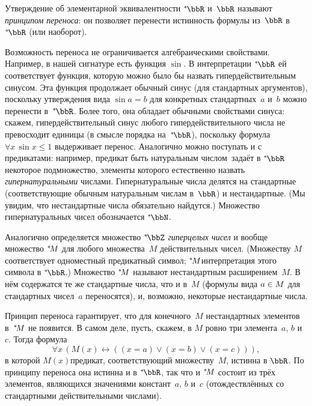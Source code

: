 Утверждение об элементарной эквивалентности $\nstR$
и~$\bbR$ называют \emph{принципом переноса}:%
он позволяет
перенести истинность формулы из~$\bbR$ в~$\nstR$ (или наоборот).

Возможность переноса не ограничивается алгебраическими
свойствами. Например, в нашей сигнатуре есть функция $\sin$. В
интерпретации $\nstR$ ей соответствует функция, которую можно
было бы назвать  гипердействительным синусом. Эта функция
продолжает обычный синус (для стандартных аргументов), поскольку
утверждения вида $\sin a = b$ для конкретных стандартных~$a$
и~$b$ можно перенести в~$\nstR$. Более того, она обладает
обычными свойствами синуса: скажем, гипердействительный синус
любого гипердействительного числа не превосходит единицы (в
смысле порядка на~$\nstR$), поскольку формула $\forall x\,{\sin
x \le 1}$ выдерживает перенос. Аналогично можно поступать и с
предикатами: например, предикат  быть натуральным числом\
задаёт в $\nstR$ некоторое подмножество, элементы которого
естественно назвать \emph{гипернатуральными}%
%
числами. Гипернатуральные
числа делятся на стандартные (соответствующие обычным натуральным
числам в~$\bbR$) и нестандартные. (Мы увидим, что нестандартные
числа обязательно найдутся.) Множество гипернатуральных чисел
обозначается $\nstbb{\bbN}$.

Аналогично определяется множество $\nstbb{\bbZ}$ \emph{гиперцелых
чисел}%
%
и вообще множество ${}^*\!M$ для любого множества~$M$
действительных чисел. (Множеству $M$ соответствует одноместный
предикатный символ; ${}^*\!M$\т интерпретация этого символа в
$\nstR$.) Множество ${}^*\!M$ называют нестандартным
расширением~$M$. В нём содержатся те же стандартные числа, что и
в~$M$ (формулы вида $a\hm\in M$ для стандартных чисел~$a$
переносятся), и, возможно, некоторые нестандартные числа.

Принцип переноса гарантирует, что для конечного~$M$
нестандартных элементов в~${}^*\!M$ не появится. В самом деле,
пусть, скажем, в $M$ ровно три элемента~$a$, $b$ и~$c$. Тогда
формула
        $$
 \forall x\,(M(x) \leftrightarrow ((x=a)\lor(x=b)\lor(x=c))),
        $$
в которой $M(x)$\т предикат, соответствующий множеству~$M$,
истинна в $\bbR$. По принципу переноса она истинна и в $\nstR$,
так что и ${}^*\!M$ состоит из трёх элементов, являющихся
значениями констант~$a$, $b$ и~$c$ (отождествлённых со
стандартными действительными числами).

